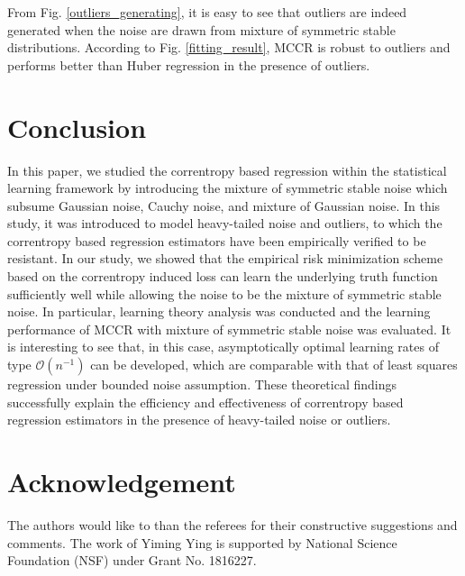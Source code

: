 \documentclass[11pt]{article}
\begin{document}
From Fig. \ref{outliers_generating}, it is easy to see that outliers are indeed generated when the noise are drawn from mixture of symmetric stable distributions. According to Fig. \ref{fitting_result}, MCCR is robust to outliers and performs better than Huber regression in the presence of outliers.

\section{Conclusion}\label{sec::conclusion}
In this paper, we studied the correntropy based regression within the statistical learning framework by introducing the mixture of symmetric stable noise which  subsume Gaussian noise, Cauchy noise, and mixture of Gaussian noise. In this study, it was introduced to model heavy-tailed noise and outliers, to which the correntropy based regression estimators have been empirically verified to be resistant. In our study, we showed that the empirical risk minimization scheme based on the correntropy induced loss can learn the underlying truth function sufficiently well while allowing the noise to be the mixture of symmetric stable noise. In particular, learning theory analysis was conducted and the learning performance of MCCR with mixture of symmetric stable noise was evaluated. It is interesting to see that, in this case, asymptotically optimal learning rates of type $\mathcal{O}(n^{-1})$ can be developed, which are comparable with that of least squares regression under bounded noise assumption. These theoretical findings successfully explain the efficiency and effectiveness of correntropy based regression estimators in the presence of heavy-tailed noise or outliers.   

\section*{Acknowledgement}
The authors would like to than the referees for their constructive suggestions and comments. The work of Yiming Ying is supported by National Science Foundation (NSF) under Grant No. 1816227.
 

  
 
\end{document}
